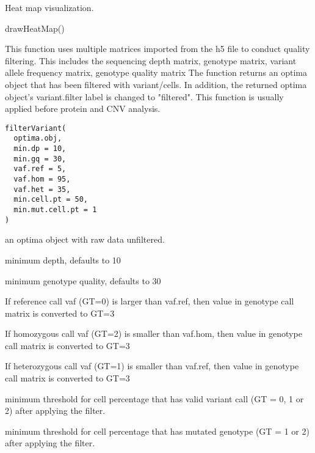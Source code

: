 \documentclass[a4paper]{book}
\begin{document}
%
\begin{Value}
Heat map visualization.
\end{Value}
%
\begin{Examples}
\begin{ExampleCode}
drawHeatMap()
\end{ExampleCode}
\end{Examples}
%
\begin{Description}\relax
This function uses multiple matrices imported from the h5 file to conduct quality filtering.
This includes the sequencing depth matrix, genotype matrix, variant allele frequency matrix, genotype quality matrix
The function returns an optima object that has been filtered with variant/cells.
In addition, the returned optima object's variant.filter label is changed to "filtered".
This function is usually applied before protein and CNV analysis.
\end{Description}
%
\begin{Usage}
\begin{verbatim}
filterVariant(
  optima.obj,
  min.dp = 10,
  min.gq = 30,
  vaf.ref = 5,
  vaf.hom = 95,
  vaf.het = 35,
  min.cell.pt = 50,
  min.mut.cell.pt = 1
)
\end{verbatim}
\end{Usage}
%
\begin{Arguments}
\begin{ldescription}
\item[\code{optima.obj}] an optima object with raw data unfiltered.

\item[\code{min.dp}] minimum depth, defaults to 10

\item[\code{min.gq}] minimum genotype quality, defaults to 30

\item[\code{vaf.ref}] If reference call vaf (GT=0) is larger than vaf.ref, then value in genotype call matrix is converted to GT=3

\item[\code{vaf.hom}] If homozygous call vaf (GT=2) is smaller than vaf.hom, then value in genotype call matrix is converted to GT=3

\item[\code{vaf.het}] If heterozygous call vaf (GT=1) is smaller than vaf.ref, then value in genotype call matrix is converted to GT=3

\item[\code{min.cell.pt}] minimum threshold for cell percentage that has valid variant call (GT = 0, 1 or 2) after applying the filter.

\item[\code{min.mut.cell.pt}] minimum threshold for cell percentage that has mutated genotype (GT = 1 or 2) after applying the filter.
\end{ldescription}
\end{Arguments}
\end{document}
